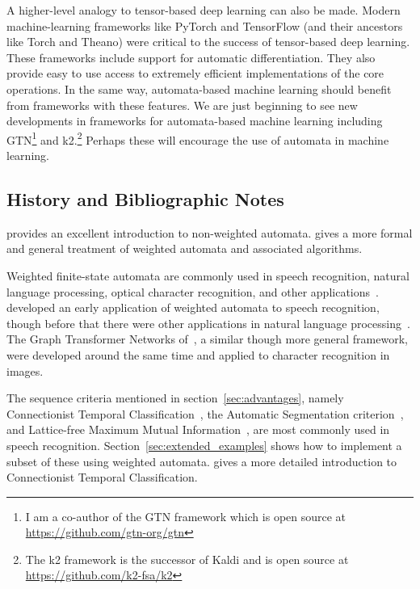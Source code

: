 A higher-level analogy to tensor-based deep learning can also be made. Modern
machine-learning frameworks like PyTorch and TensorFlow (and their ancestors
like Torch and Theano) were critical to the success of tensor-based deep
learning. These frameworks include support for automatic differentiation. They
also provide easy to use access to extremely efficient implementations of the
core operations. In the same way, automata-based machine learning should
benefit from frameworks with these features. We are just beginning to see new
developments in frameworks for automata-based machine learning including
GTN\footnote{I am a co-author of the GTN framework which is open source at
\url{https://github.com/gtn-org/gtn}} and k2.\footnote{The k2 framework is the
successor of Kaldi and is open source at \url{https://github.com/k2-fsa/k2}}
Perhaps these will encourage the use of automata in machine learning.

\subsection{History and Bibliographic Notes}

\citet{hopcroft2001introduction} provides an excellent introduction to
non-weighted automata. \citet{mohri2009weighted} gives a more formal and
general treatment of weighted automata and associated algorithms.

Weighted finite-state automata are commonly used in speech recognition, natural
language processing, optical character recognition, and other
applications~\citep{breuel2008ocropus, knight2009applications, mohri1997finite,
mohri2002weighted, mohri2008speech}. \citet{pereira1997} developed an early
application of weighted automata to speech recognition, though before that
there were other applications in natural language
processing~\citep{pereira1994weighted, sproat1996stochastic}. The Graph
Transformer Networks of~\citet{bottou97}, a similar though more general
framework, were developed around the same time and applied to character
recognition in images.

The sequence criteria mentioned in section~\ref{sec:advantages}, namely
Connectionist Temporal Classification~\citep{graves2006}, the Automatic
Segmentation criterion~\citep{collobert2016wav2letter}, and Lattice-free
Maximum Mutual Information~\citep{povey2016purely}, are most commonly used in
speech recognition. Section~\ref{sec:extended_examples} shows how to implement
a subset of these using weighted automata. \citet{hannun2017sequence} gives a
more detailed introduction to Connectionist Temporal Classification.


